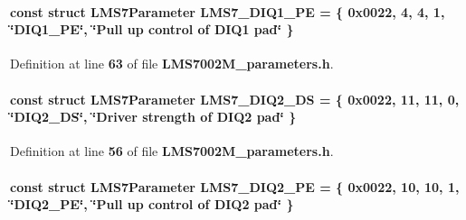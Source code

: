 \paragraph[{L\+M\+S7\+\_\+\+D\+I\+Q1\+\_\+\+PE}]{\setlength{\rightskip}{0pt plus 5cm}const struct {\bf L\+M\+S7\+Parameter} L\+M\+S7\+\_\+\+D\+I\+Q1\+\_\+\+PE = \{ 0x0022, 4, 4, 1, \char`\"{}\+D\+I\+Q1\+\_\+\+P\+E\char`\"{}, \char`\"{}\+Pull up control of D\+I\+Q1 pad\char`\"{} \}\hspace{0.3cm}{\ttfamily [static]}}\label{LMS7002M__parameters_8h_ac20d223b06c1ea4fb85ba85f7582fc45}


Definition at line {\bf 63} of file {\bf L\+M\+S7002\+M\+\_\+parameters.\+h}.

\paragraph[{L\+M\+S7\+\_\+\+D\+I\+Q2\+\_\+\+DS}]{\setlength{\rightskip}{0pt plus 5cm}const struct {\bf L\+M\+S7\+Parameter} L\+M\+S7\+\_\+\+D\+I\+Q2\+\_\+\+DS = \{ 0x0022, 11, 11, 0, \char`\"{}\+D\+I\+Q2\+\_\+\+D\+S\char`\"{}, \char`\"{}\+Driver strength of D\+I\+Q2 pad\char`\"{} \}\hspace{0.3cm}{\ttfamily [static]}}\label{LMS7002M__parameters_8h_a0db96b00083738261021a061659ce75c}


Definition at line {\bf 56} of file {\bf L\+M\+S7002\+M\+\_\+parameters.\+h}.

\paragraph[{L\+M\+S7\+\_\+\+D\+I\+Q2\+\_\+\+PE}]{\setlength{\rightskip}{0pt plus 5cm}const struct {\bf L\+M\+S7\+Parameter} L\+M\+S7\+\_\+\+D\+I\+Q2\+\_\+\+PE = \{ 0x0022, 10, 10, 1, \char`\"{}\+D\+I\+Q2\+\_\+\+P\+E\char`\"{}, \char`\"{}\+Pull up control of D\+I\+Q2 pad\char`\"{} \}\hspace{0.3cm}{\ttfamily [static]}}\label{LMS7002M__parameters_8h_a2f122538a32be281a821c969dd60a56d}


